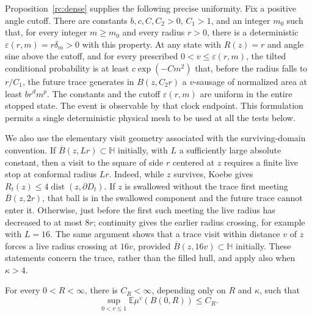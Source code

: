Proposition~\ref{rc:dense} supplies the following precise uniformity.  Fix a
positive angle cutoff.  There are constants \(b,c,C,C_2>0\), \(C_1>1\),
and an integer \(m_0\) such that, for every integer \(m\ge m_0\)
and every radius \(r>0\), there is a deterministic
\(\varepsilon(r,m)=r\delta_m>0\) with this property.  At any state with
\(R(z)=r\) and angle sine above the cutoff, and for every prescribed
\(0<v\le\varepsilon(r,m)\), the tilted conditional probability is
at least \(c\exp(-Cm^2)\) that, before the radius falls to
\(r/C_1\), the future trace generates in \(B(z,C_2r)\) a
\(v\)-sausage of normalized area at least \(b r^d m^p\).
The constants and the cutoff \(\varepsilon(r,m)\) are uniform in
the entire stopped state.  The event is observable by that clock
endpoint.  This formulation permits a single deterministic physical
mesh to be used at all the tests below.

We also use the elementary visit geometry associated with the
surviving-domain convention.  If \(\overline B(z,Lr)\subset\mathbb H\)
initially, with \(L\) a sufficiently large absolute constant, then a
visit to the square of side \(r\) centered at \(z\) requires a finite
live stop at conformal radius \(Lr\).  Indeed, while \(z\) survives,
Koebe gives
\(R_t(z)\le4\operatorname{dist}(z,\partial D_t)\).
If \(z\) is swallowed without the trace first meeting
\(\overline B(z,2r)\), that ball is in the swallowed component and
the future trace cannot enter it.  Otherwise, just before the first
such meeting the live radius has decreased to at most \(8r\);
continuity gives the earlier radius crossing, for example with
\(L=16\).  The same argument shows that a trace visit within
distance \(v\) of \(z\) forces a live radius crossing at \(16v\),
provided \(\overline B(z,16v)\subset\mathbb H\) initially.
These statements concern the trace, rather
than the filled hull, and apply also when \(\kappa>4\).

\begin{lemma}
\label{lem:cover-charge}
For every \(0<R<\infty\), there is \(C_R<\infty\), depending only on
\(R\) and \(\kappa\), such that
\[
 \sup_{0<v\le1}\mathbb E\mu^v(B(0,R))\le C_R.
\]
\end{lemma}

